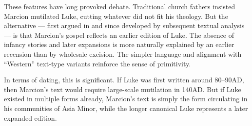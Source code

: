 These features have long provoked debate.
Traditional church fathers insisted Marcion mutilated Luke, cutting whatever did not fit his theology.
But the alternative --- first argued in \cite{harnack:marcion} and since developed by subsequent textual analysis --- is that Marcion's gospel reflects an earlier edition of Luke.
The absence of infancy stories and later expansions is more naturally explained by an earlier recension than by wholesale excision.
The simpler language and alignment with “Western” text-type variants reinforce the sense of primitivity.

In terms of dating, this is significant.
If Luke was first written around 80--90AD, then Marcion’s text would require large-scale mutilation in 140AD.
But if Luke existed in multiple forms already, Marcion’s text is simply the form circulating in his communities of Asia Minor, while the longer canonical Luke represents a later expanded edition.

